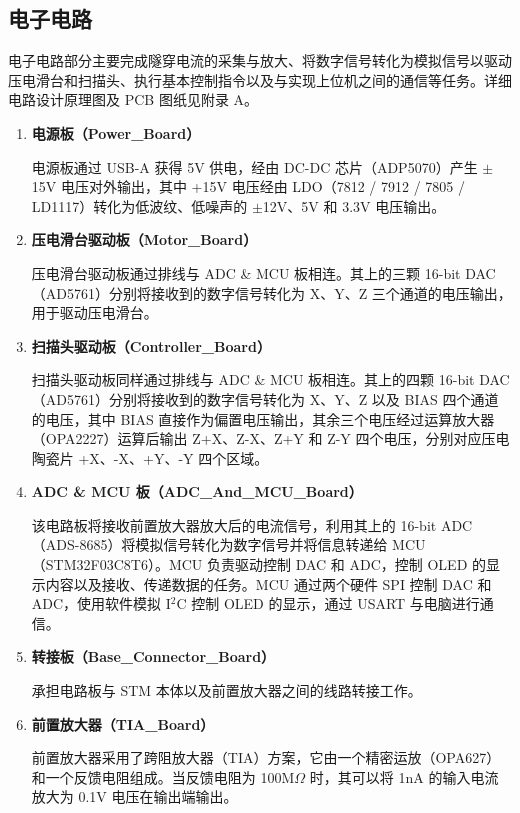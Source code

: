 \documentclass{article}
\begin{document}
\subsection{电子电路}
电子电路部分主要完成隧穿电流的采集与放大、将数字信号转化为模拟信号以驱动压电滑台和扫描头、执行基本控制指令以及与实现上位机之间的通信等任务。详细电路设计原理图及 PCB 图纸见附录 A。
\begin{enumerate}
	\item \textbf{电源板（Power\_Board）}\par
	      \qquad 电源板通过 USB-A 获得 5V 供电，经由 DC-DC 芯片（ADP5070）产生 $\pm$15V 电压对外输出，其中 +15V 电压经由 LDO（7812 / 7912 / 7805 / LD1117）转化为低波纹、低噪声的 $\pm$12V、5V 和 3.3V 电压输出。

	\item \textbf{压电滑台驱动板（Motor\_Board）}\par
	      \qquad 压电滑台驱动板通过排线与 ADC \& MCU 板相连。其上的三颗 16-bit DAC（AD5761）分别将接收到的数字信号转化为 X、Y、Z 三个通道的电压输出，用于驱动压电滑台。

	\item \textbf{扫描头驱动板（Controller\_Board）}\par
	      \qquad 扫描头驱动板同样通过排线与 ADC \& MCU 板相连。其上的四颗 16-bit DAC（AD5761）分别将接收到的数字信号转化为 X、Y、Z 以及 BIAS 四个通道的电压，其中 BIAS 直接作为偏置电压输出，其余三个电压经过运算放大器（OPA2227）运算后输出 Z+X、Z-X、Z+Y 和 Z-Y 四个电压，分别对应压电陶瓷片 +X、-X、+Y、-Y 四个区域。

	\item \textbf{ADC \& MCU 板（ADC\_And\_MCU\_Board）}\par
	      \qquad 该电路板将接收前置放大器放大后的电流信号，利用其上的 16-bit ADC（ADS-8685）将模拟信号转化为数字信号并将信息转递给 MCU（STM32F03C8T6）。MCU 负责驱动控制 DAC 和 ADC，控制 OLED 的显示内容以及接收、传递数据的任务。MCU 通过两个硬件 SPI 控制 DAC 和 ADC，使用软件模拟 I$^\text{2}$C 控制 OLED 的显示，通过 USART 与电脑进行通信。

	\item \textbf{转接板（Base\_Connector\_Board）}\par
	      \qquad 承担电路板与 STM 本体以及前置放大器之间的线路转接工作。

	\item \textbf{前置放大器（TIA\_Board）}\par
	      \qquad 前置放大器采用了跨阻放大器（TIA）方案，它由一个精密运放（OPA627）和一个反馈电阻组成。当反馈电阻为 100M$\Omega$ 时，其可以将 1nA 的输入电流放大为 0.1V 电压在输出端输出。

\end{enumerate}
\end{document}
